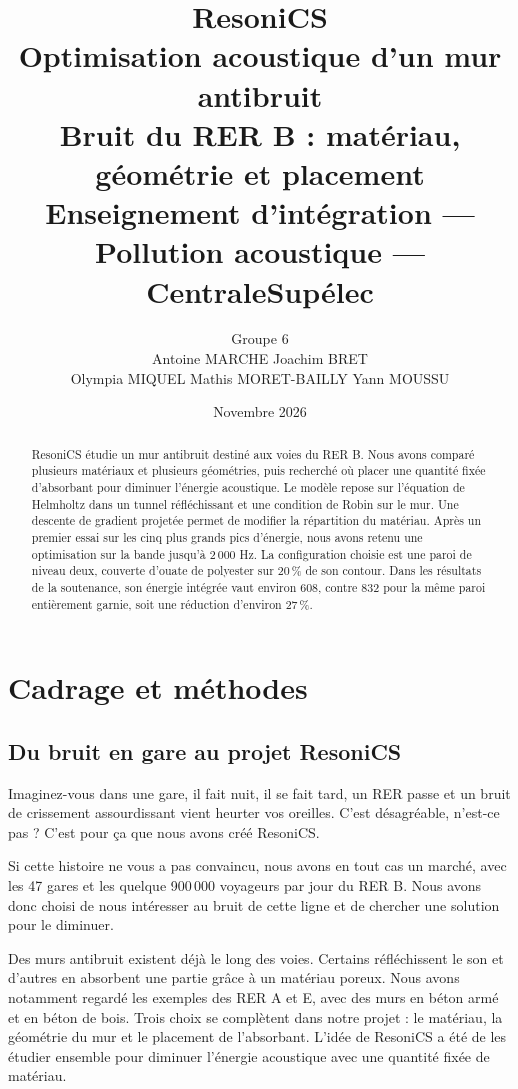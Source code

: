 \documentclass[11pt,a4paper]{article}
\title{\textbf{ResoniCS}\\[0.3em]
\Large Optimisation acoustique d'un mur antibruit\\[0.2em]
\normalsize Bruit du RER B : matériau, géométrie et placement\\[0.5em]
\small Enseignement d'intégration --- Pollution acoustique --- CentraleSupélec}
\author{\normalsize Groupe 6\\[0.3em]
\small Antoine MARCHE \quad Joachim BRET\\
\small Olympia MIQUEL \quad Mathis MORET-BAILLY \quad Yann MOUSSU}
\date{Novembre 2026}
\begin{document}
\maketitle
\begin{abstract}
ResoniCS étudie un mur antibruit destiné aux voies du RER B. Nous avons comparé plusieurs matériaux et plusieurs géométries, puis recherché où placer une quantité fixée d'absorbant pour diminuer l'énergie acoustique. Le modèle repose sur l'équation de Helmholtz dans un tunnel réfléchissant et une condition de Robin sur le mur. Une descente de gradient projetée permet de modifier la répartition du matériau. Après un premier essai sur les cinq plus grands pics d'énergie, nous avons retenu une optimisation sur la bande jusqu'à 2\,000 Hz. La configuration choisie est une paroi de niveau deux, couverte d'ouate de polyester sur 20\,\% de son contour. Dans les résultats de la soutenance, son énergie intégrée vaut environ 608, contre 832 pour la même paroi entièrement garnie, soit une réduction d'environ 27\,\%.
\end{abstract}

\clearpage
\begingroup
\footnotesize
\setlength{\parskip}{0pt}
\hypersetup{linkcolor=black}
\tableofcontents
\endgroup
\hypersetup{linkcolor=blue}
\clearpage
\section{Cadrage et méthodes}
\subsection{Du bruit en gare au projet ResoniCS}
Imaginez-vous dans une gare, il fait nuit, il se fait tard, un RER passe et un bruit de crissement assourdissant vient heurter vos oreilles. C'est désagréable, n'est-ce pas ? C'est pour ça que nous avons créé ResoniCS.

Si cette histoire ne vous a pas convaincu, nous avons en tout cas un marché, avec les 47 gares et les quelque 900\,000 voyageurs par jour du RER B. Nous avons donc choisi de nous intéresser au bruit de cette ligne et de chercher une solution pour le diminuer.

Des murs antibruit existent déjà le long des voies. Certains réfléchissent le son et d'autres en absorbent une partie grâce à un matériau poreux. Nous avons notamment regardé les exemples des RER A et E, avec des murs en béton armé et en béton de bois. Trois choix se complètent dans notre projet : le matériau, la géométrie du mur et le placement de l'absorbant. L'idée de ResoniCS a été de les étudier ensemble pour diminuer l'énergie acoustique avec une quantité fixée de matériau.
\end{document}
